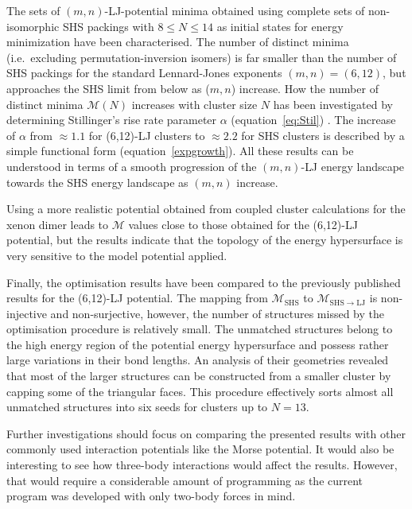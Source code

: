 The sets of $(m,n)$-\ac{LJ}-potential minima obtained using
complete sets of non-isomorphic \ac{SHS} packings with $8 \leq N \leq 14$
\autocite{Arkus_Minimalenergyclusters_2009,Arkus_DerivingFiniteSphere_2011,Hoy_Structurefinitesphere_2012,Hoy_Structuredynamicsmodel_2015,Holmes-Cerfon_EnumeratingRigidSphere_2016}
as initial states for energy minimization have been characterised. The number of
distinct minima (i.e.~excluding permutation-inversion isomers) is far smaller
than the number of \ac{SHS} packings for the standard Lennard-Jones exponents
$(m,n) = (6,12)$, but approaches the \ac{SHS} limit from below as ($m,n$)
increase. How the number of distinct minima $\mathcal{M}(N)$ increases with
cluster size $N$ has been investigated by determining Stillinger's rise rate
parameter $\alpha$ (equation~\eqref{eq:Stil})
\autocite{Stillinger_Exponentialmultiplicityinherent_1999}. The increase of
$\alpha$ from $\approx 1.1$ for (6,12)-\ac{LJ} clusters to $\approx 2.2$ for
\ac{SHS} clusters is described by a simple functional form
(equation~\eqref{expgrowth}). All these results can be understood in terms of a
smooth progression of the $(m,n)$-\ac{LJ} energy landscape towards the \ac{SHS}
energy landscape as $(m,n)$ increase.

Using a more realistic  potential obtained from coupled cluster
calculations for the xenon dimer
\autocite{Schwerdtfeger_ExtensionLennardJonespotential_2006,Jerabek_relativisticcoupledclusterinteraction_2017}
leads to $\mathcal{M}$ values close to those obtained for the
(6,12)-\ac{LJ} potential, but the results indicate that the topology of
the energy hypersurface is very sensitive to the model potential applied.  

Finally, the optimisation results have been compared to the previously published
results for the (6,12)-\ac{LJ} potential. The mapping from
$\mathcal{M}_\text{SHS}$ to $\mathcal{M}_\mathrm{SHS\to LJ}$ is non-injective
and non-surjective, however, the number of structures missed by the optimisation
procedure is relatively small. The unmatched structures belong to the high
energy region of the potential energy hypersurface and possess rather large
variations in their bond lengths. An analysis of their geometries revealed that
most of the larger structures can be constructed from a smaller cluster by
capping some of the triangular faces. This procedure effectively sorts almost
all unmatched structures into six seeds for clusters up to $N=13$. 

Further investigations should focus on comparing the presented results with
other commonly used interaction potentials like the Morse potential. It would
also be interesting to see how three-body interactions would affect the results.
However, that would require a considerable amount of programming as the current
program was developed with only two-body forces in mind.


